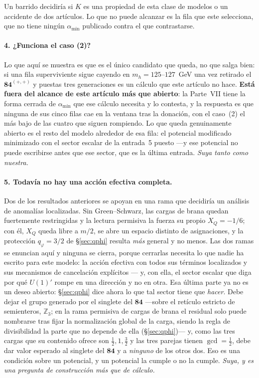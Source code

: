 \documentclass[11pt,a4paper]{article}
\newcommand{\ZZ}{\mathbb{Z}}
\newcommand{\rep}[1]{\mathbf{#1}}
\newcommand{\amin}{\alpha_{\min}}
\begin{document}
Un barrido decidiría si $K$ es una propiedad de esta clase de modelos o un accidente de dos
artículos. Lo que no puede alcanzar es la fila que este selecciona, que no tiene ningún $\amin$
publicado contra el que contrastarse.

\paragraph{4. ¿Funciona el caso (2)?} Lo que aquí se muestra es que es el único candidato que queda,
no que salga bien: si una fila superviviente sigue cayendo en $m_h=125$--$127$~GeV una vez retirado
el $\rep{84}^{(+,+)}$ y puestas tres generaciones es un cálculo que este artículo no hace.
\textbf{Está fuera del alcance de este artículo más que abierto}: la Parte~VII \cite{PartVII} tiene
la forma cerrada de $\amin$ que ese cálculo necesita y lo contesta, y la respuesta es que ninguna de
sus cinco filas cae en la ventana tras la donación, con el caso~(2) el más bajo de las cuatro que
siguen rompiendo. Lo que queda genuinamente abierto es el resto del modelo alrededor de esa fila: el
potencial modificado minimizado con el sector escalar de la entrada~5 puesto ---y ese potencial no
puede escribirse antes que ese sector, que es la última entrada. \emph{Suya tanto como nuestra.}

\paragraph{5. Todavía no hay una acción efectiva completa.} Dos de los resultados anteriores se
apoyan en una rama que decidiría un análisis de anomalías localizadas. Sin Green--Schwarz, las cargas
de brana quedan fuertemente restringidas y la lectura permisiva la fuerza su propio $X_Q=-1/6$; con
él, $X_Q$ queda libre a $m/2$, se abre un espacio distinto de asignaciones, y la protección
$q_\varphi=3/2$ de \S\ref{sec:qphi} resulta \emph{más} general y no menos. Las dos ramas se enuncian
aquí y ninguna se cierra, porque cerrarlas necesita lo que nadie ha escrito para este modelo: la
acción efectiva con todos sus términos localizados y sus mecanismos de cancelación explícitos ---
y, con ella, el sector escalar que diga por qué $U(1)'$ rompe en una dirección y no en otra. Esa
última parte ya no es un deseo abierto: \S\ref{sec:qphi} dice ahora lo que tal sector tiene que
\emph{hacer}. Debe dejar el grupo generado por el singlete del $\rep{84}$ ---sobre el retículo
estricto de semienteros, $\ZZ_3$; en la rama permisiva de cargas de brana el residual solo puede
nombrarse tras fijar la normalización global de la carga, siendo la regla de divisibilidad la parte
que no depende de ella (\S\ref{sec:qphi})--- y, como las tres cargas que su contenido ofrece son
$\tfrac12,1,\tfrac32$ y las tres parejas tienen $\gcd=\tfrac12$, debe dar valor esperado al
singlete del $\rep{84}$ y a \emph{ninguno} de los otros dos. Eso es una condición sobre un
potencial, y un potencial la cumple o no la cumple.
\emph{Suya, y es una pregunta de construcción más que de cálculo.}
\end{document}
